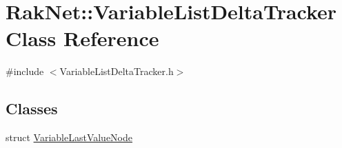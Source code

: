 \hypertarget{class_rak_net_1_1_variable_list_delta_tracker}{\section{Rak\-Net\-:\-:Variable\-List\-Delta\-Tracker Class Reference}
\label{class_rak_net_1_1_variable_list_delta_tracker}
}


{\ttfamily \#include $<$Variable\-List\-Delta\-Tracker.\-h$>$}

\subsection*{Classes}
\begin{DoxyCompactItemize}
\item 
struct \hyperlink{struct_rak_net_1_1_variable_list_delta_tracker_1_1_variable_last_value_node}{Variable\-Last\-Value\-Node}
\end{DoxyCompactItemize}
